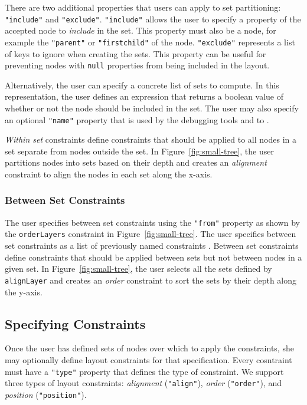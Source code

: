 There are two additional properties that users can apply to set partitioning: \texttt{"include"} and \texttt{"exclude"}. \texttt{"include"} allows the user to specify a property of the accepted node to \emph{include} in the set. This property must also be a node, for example the \texttt{"parent"} or \texttt{"firstchild"} of the node. \texttt{"exclude"} represents a list of keys to ignore when creating the sets. This property can be useful for preventing nodes with \texttt{null} properties from being included in the layout. 

Alternatively, the user can specify a concrete list of sets to compute. In this representation, the user defines an expression that returns a boolean value of whether or not the node should be included in the set. The user may also specify an optional \texttt{"name"} property that is used by the debugging tools and to .  

\emph{Within set} constraints define constraints that should be applied to all nodes in a set separate from nodes outside the set. In Figure~\ref{fig:small-tree}, the user partitions nodes into sets based on their depth and creates an \emph{alignment} constraint to align the nodes in each set along the x-axis.

\subsubsection{Between Set Constraints}
The user specifies between set constraints using the \texttt{"from"} property as shown by the \texttt{orderLayers} constraint in Figure~\ref{fig:small-tree}. The user specifies between set constraints as a list of previously named constraints . Between set constraints define constraints that should be applied between sets but not between nodes in a given set. In Figure~\ref{fig:small-tree}, the user selects all the sets defined by \texttt{alignLayer} and creates an \emph{order} constraint to sort the sets by their depth along the y-axis.

\subsection{Specifying Constraints}
Once the user has defined sets of nodes over which to apply the constraints, she may optionally define layout constraints for that specification. Every cosntraint must have a \texttt{"type"} property that defines the type of constraint. We support three types of layout constraints: \emph{alignment} (\texttt{"align"}), \emph{order} (\texttt{"order"}), and \emph{position} (\texttt{"position"}).

